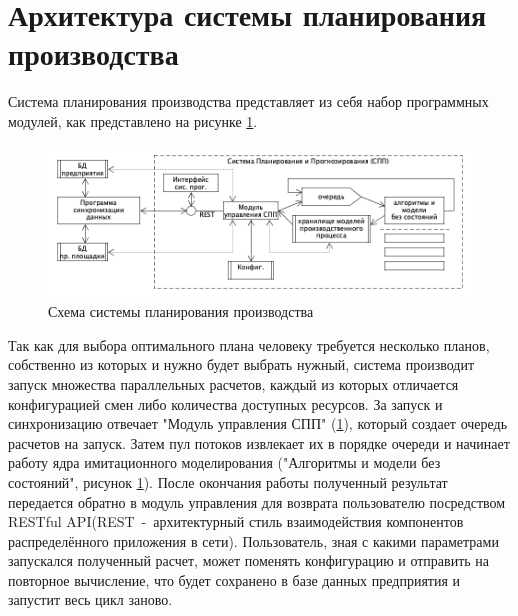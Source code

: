 \section{Архитектура системы планирования производства}
\indent Система планирования производства представляет из себя набор программных модулей, как представлено на рисунке \ref{fig:archSPP}.

\begin{figure}[ht]
	\centering
	\includegraphics[width=\linewidth]{pics/archSPP.png}
	\caption{Схема системы планирования производства \cite{niorkpz}}
	\label{fig:archSPP}
\end{figure}

\indent Так как для выбора оптимального плана человеку требуется несколько планов, собственно из которых и нужно будет выбрать нужный, система производит запуск множества параллельных расчетов, каждый из которых отличается конфигурацией смен либо количества доступных ресурсов.
За запуск и синхронизацию отвечает "Модуль управления СПП" (\ref{fig:archSPP}), который создает очередь расчетов на запуск.
Затем пул потоков извлекает их в порядке очереди и начинает работу ядра имитационного моделирования ("Алгоритмы и модели без состояний", рисунок \ref{fig:archSPP}).
После окончания работы полученный результат передается обратно в модуль управления для возврата пользователю посредством RESTful API(REST~-~архитектурный стиль взаимодействия компонентов распределённого приложения в сети).
Пользователь, зная с какими параметрами запускался полученный расчет, может поменять конфигурацию и отправить на повторное вычисление, что будет сохранено в базе данных предприятия и запустит весь цикл заново.